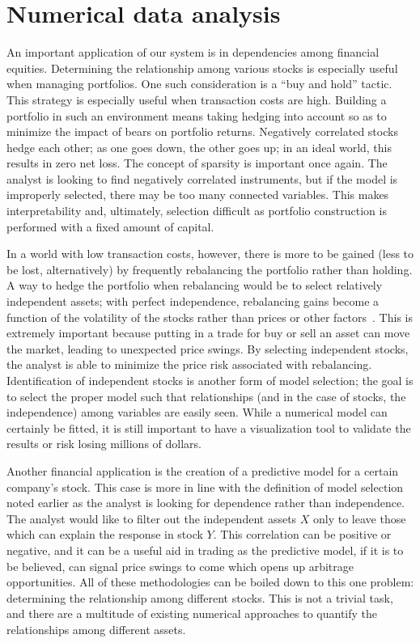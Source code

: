 \section{Numerical data analysis}
\label{sec:intro:numerical}

An important application of our system is in dependencies among financial equities. Determining the relationship among various stocks is especially useful when managing portfolios. One such consideration is a ``buy and hold'' tactic. This strategy is especially useful when transaction costs are high. Building a portfolio in such an environment means taking hedging into account so as to minimize the impact of bears on portfolio returns. Negatively correlated stocks hedge each other; as one goes down, the other goes up; in an ideal world, this results in zero net loss. The concept of sparsity is important once again. The analyst is looking to find negatively correlated instruments, but if the model is improperly selected, there may be too many connected variables. This makes interpretability and, ultimately, selection difficult as portfolio construction is performed with a fixed amount of capital.

In a world with low transaction costs, however, there is more to be gained (less to be lost, alternatively) by frequently rebalancing the portfolio rather than holding. A way to hedge the portfolio when rebalancing would be to select relatively independent assets; with perfect independence, rebalancing gains become a function of the volatility of the stocks rather than prices or other factors~\cite{liuh2016}. This is extremely important because putting in a trade for buy or sell an asset can move the market, leading to unexpected price swings. By selecting independent stocks, the analyst is able to minimize the price risk associated with rebalancing. Identification of independent stocks is another form of model selection; the goal is to select the proper model such that relationships (and in the case of stocks, the independence) among variables are easily seen. While a numerical model can certainly be fitted, it is still important to have a visualization tool to validate the results or risk losing millions of dollars.

Another financial application is the creation of a predictive model for a certain company's stock. This case is more in line with the definition of model selection noted earlier as the analyst is looking for dependence rather than independence. The analyst would like to filter out the independent assets $X$ only to leave those which can explain the response in stock $Y$. This correlation can be positive or negative, and it can be a useful aid in trading as the predictive model, if it is to be believed, can signal price swings to come which opens up arbitrage opportunities. All of these methodologies can be boiled down to this one problem: determining the relationship among different stocks. This is not a trivial task, and there are a multitude of existing numerical approaches to quantify the relationships among different assets. 







